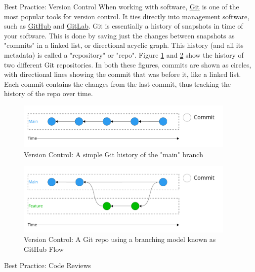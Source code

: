 \documentclass[final]{beamer}
\newlength{\colwidth}
\begin{document}
\begin{frame}[t]
\begin{columns}[t]
\begin{column}{\colwidth}
\begin{block}{Best Practice: Version Control}
    When working with software, \href{https://git-scm.com/}{Git} is one of the
    most popular tools for version control.
    It ties directly into management software, such as
    \href{https://github.com}{GitHub} and \href{https://gitlab.com}{GitLab}.
    Git is essentially a history of snapshots in time of your software.
    This is done by saving just the changes between snapshots as "commits" in
    a linked list, or directional acyclic graph.
    This history (and all its metadata) is called a "repository" or "repo".
    Figure \ref{fig:git-simple} and \ref{fig:git-github-flow} show the history
    of two different Git repositories.
    In both these figures, commits are shown as circles, with directional lines
    showing the commit that was before it, like a linked list.
    Each commit contains the changes from the last commit, thus tracking the
    history of the repo over time.

    \begin{figure}
      \centering
      \includegraphics[width=0.95\textwidth]{tess2024/git-simple-git-repo.pdf}
      \caption{Version Control: A simple Git history of the "main" branch}
      \label{fig:git-simple}
    \end{figure}

    \begin{figure}
      \centering
      \includegraphics[width=0.95\textwidth]{tess2024/git-github-flow.pdf}
      \caption{Version Control: A Git repo using a branching model known as
        GitHub Flow}
      \label{fig:git-github-flow}
    \end{figure}

  \end{block}

  \begin{block}{Best Practice: Code Reviews}


\end{block}
\end{column}
\end{columns}
\end{frame}
\end{document}
